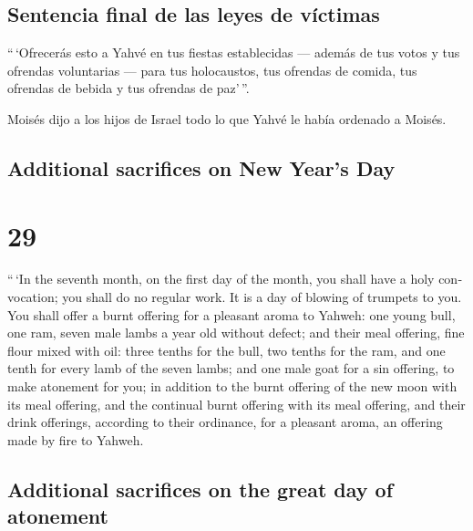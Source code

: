 \begin{paracol}{2}
\hypertarget{sentencia-final-de-las-leyes-de-vuxedctimas}{%
\subsection{Sentencia final de las leyes de
víctimas}\label{sentencia-final-de-las-leyes-de-vuxedctimas}}

 ``\,`Ofrecerás esto a Yahvé en tus fiestas establecidas
--- además de tus votos y tus ofrendas voluntarias --- para tus
holocaustos, tus ofrendas de comida, tus ofrendas de bebida y tus
ofrendas de paz'\,''.

 Moisés dijo a los hijos de Israel todo lo que Yahvé le
había ordenado a Moisés.

\switchcolumn
\begin{otherlanguage}{english}

\hypertarget{additional-sacrifices-on-new-years-day}{%
\subsection{Additional sacrifices on New Year's
Day}\label{additional-sacrifices-on-new-years-day}}

\hypertarget{section-57}{%
\section{29}\label{section-57}}

 ``\,`In the seventh month, on the first day of the month,
you shall have a holy convocation; you shall do no regular work. It is a
day of blowing of trumpets to you.  You shall offer a
burnt offering for a pleasant aroma to Yahweh: one young bull, one ram,
seven male lambs a year old without defect;  and their
meal offering, fine flour mixed with oil: three tenths for the bull, two
tenths for the ram,  and one tenth for every lamb of the
seven lambs;  and one male goat for a sin offering, to
make atonement for you;  in addition to the burnt offering
of the new moon with its meal offering, and the continual burnt offering
with its meal offering, and their drink offerings, according to their
ordinance, for a pleasant aroma, an offering made by fire to Yahweh.

\hypertarget{additional-sacrifices-on-the-great-day-of-atonement}{%
\subsection{Additional sacrifices on the great day of
atonement}\label{additional-sacrifices-on-the-great-day-of-atonement}}


\end{otherlanguage}
\end{paracol}
